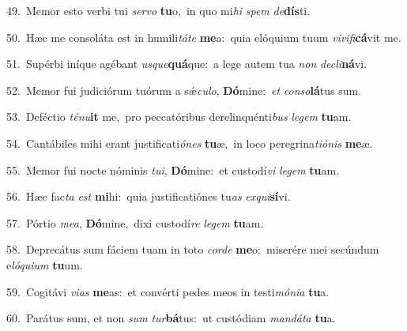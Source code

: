 {\numbfont\textcolor{\numbcolor}{49.}}~Memor esto verbi tui \textit{ser}\-\textit{vo} \textbf{tu}\-o,~\star in quo mi\textit{hi} \textit{spem} \textit{de}\-\textbf{dís}ti.\par
{\numbfont\textcolor{\numbcolor}{50.}}~Hæc me consoláta est in humili\-\textit{tá}\-\textit{te} \textbf{me}\-a:~\star quia elóquium tuum \textit{vi}\-\textit{vi}\textit{fi}\textbf{cá}vit me.\par
{\numbfont\textcolor{\numbcolor}{51.}}~Supérbi iníque agébant \textit{us}\-\textit{que}\textbf{quá}que:~\star a lege autem tua \textit{non} \textit{de}\-\textit{cli}\textbf{ná}vi.\par
{\numbfont\textcolor{\numbcolor}{52.}}~Memor fui judiciórum tuórum a sǽ\-\textit{cu}\-\textit{lo}, \textbf{Dó}\-mine:~\star \textit{et} \textit{con}\-\textit{so}\textbf{lá}tus sum.\par
{\numbfont\textcolor{\numbcolor}{53.}}~Deféctio \textit{té}\-\textit{nu}\textbf{it} me,~\star pro peccatóribus derelinquénti\textit{bus} \textit{le}\-\textit{gem} \textbf{tu}\-am.\par
{\numbfont\textcolor{\numbcolor}{54.}}~Cantábiles mihi erant justificati\-\textit{ó}\-\textit{nes} \textbf{tu}\-æ,~\star in loco peregrina\-\textit{ti}\-\textit{ó}\textit{nis} \textbf{me}\-æ.\par
{\numbfont\textcolor{\numbcolor}{55.}}~Memor fui nocte nóminis \textit{tu}\-\textit{i}, \textbf{Dó}\-mine:~\star et custodí\textit{vi} \textit{le}\-\textit{gem} \textbf{tu}\-am.\par
{\numbfont\textcolor{\numbcolor}{56.}}~Hæc fac\textit{ta} \textit{est} \textbf{mi}\-hi:~\star quia justificatiónes tu\textit{as} \textit{ex}\-\textit{qui}\textbf{sí}vi.\par
{\numbfont\textcolor{\numbcolor}{57.}}~Pórtio \textit{me}\-\textit{a}, \textbf{Dó}\-mine,~\star dixi custodí\textit{re} \textit{le}\-\textit{gem} \textbf{tu}\-am.\par
{\numbfont\textcolor{\numbcolor}{58.}}~Deprecátus sum fáciem tuam in toto \textit{cor}\-\textit{de} \textbf{me}\-o:~\star miserére mei secúndum e\-\textit{ló}\-\textit{qui}\textit{um} \textbf{tu}\-um.\par
{\numbfont\textcolor{\numbcolor}{59.}}~Cogitávi \textit{vi}\-\textit{as} \textbf{me}\-as:~\star et convérti pedes meos in testi\-\textit{mó}\-\textit{ni}\textit{a} \textbf{tu}\-a.\par
{\numbfont\textcolor{\numbcolor}{60.}}~Parátus sum, et non \textit{sum} \textit{tur}\-\textbf{bá}tus:~\star ut custódiam \textit{man}\-\textit{dá}\textit{ta} \textbf{tu}\-a.\par
